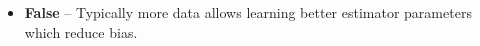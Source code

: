\begin{itemize}
   \item[] {\bf False} -- Typically more data allows learning better estimator parameters which reduce bias. 
\end{itemize} 

